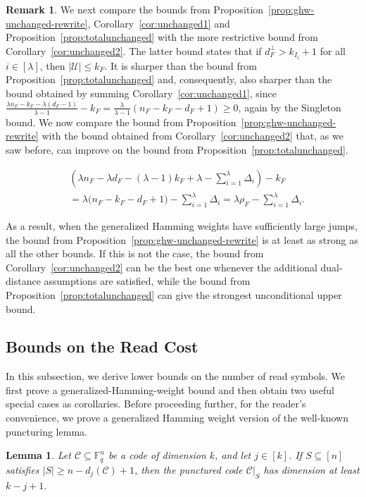 \documentclass[conference, 10pt]{IEEEtran}
\theoremstyle{plain}
\newtheorem{lemma}[theorem]{Lemma}
\theoremstyle{definition}
\newtheorem{remark}[definition]{Remark}
\newcommand{\numberset}{\mathbb}
\newcommand{\F}{\numberset{F}}
\newcommand{\mC}{\mathcal{C}}
\newcommand{\mU}{\mathcal{U}}
\begin{document}
\begin{remark}
We next compare the bounds from Proposition~\ref{prop:ghw-unchanged-rewrite}, Corollary~\ref{cor:unchanged1} and Proposition~\ref{prop:totalunchanged} with the more restrictive bound from Corollary~\ref{cor:unchanged2}. The latter bound states that if $d_F^\perp>k_{I_i}+1$ for all $i\in [\lambda]$, then $|\mU|\le k_F$. It is sharper than the bound from Proposition~\ref{prop:totalunchanged} and, consequently, also sharper than
the bound obtained by summing Corollary~\ref{cor:unchanged1}, since
$\frac{\lambda n_F-k_F-\lambda(d_F-1)}{\lambda-1}-k_F=\frac{\lambda}{\lambda-1}(n_F-k_F-d_F+1)\ge 0$, 
again by the Singleton bound. 
We now compare the bound from Proposition~\ref{prop:ghw-unchanged-rewrite} with the bound obtained from Corollary~\ref{cor:unchanged2} that, as we saw before, can improve on the bound from Proposition~\ref{prop:totalunchanged}.

\begin{align*} &\left( \lambda n_F-\lambda d_F-(\lambda-1)k_F+\lambda -\sum_{i=1}^{\lambda}\Delta_i \right)-k_F\\ &= \lambda\bigl(n_F-k_F-d_F+1\bigr) -\sum_{i=1}^{\lambda}\Delta_i= \lambda\rho_F-\sum_{i=1}^{\lambda}\Delta_i . \end{align*} 

As a result, when the generalized Hamming weights have sufficiently large jumps, the bound from Proposition~\ref{prop:ghw-unchanged-rewrite} is at least as strong as all the other bounds. If this is not the case, the bound from Corollary~\ref{cor:unchanged2} can be the best one whenever the additional dual-distance assumptions are satisfied, while the bound from Proposition~\ref{prop:totalunchanged} can give the strongest unconditional upper bound.
\end{remark}

\subsection{Bounds on the Read Cost}
\label{subsec:boundsread}

In this subsection, we derive lower bounds on the number of read symbols. We first prove a generalized-Hamming-weight bound and then obtain two useful special cases as corollaries. Before proceeding further, for the reader’s convenience, we prove a generalized Hamming weight version of the well-known puncturing lemma. 

\begin{lemma}\label{lem:puncturing-ghw-rewrite}
Let $\mC\subseteq \F_q^n$ be a code of dimension $k$, and let $j\in [k]$. If $S\subseteq [n]$ satisfies $|S|\ge n-d_j(\mC)+1$, then the punctured code $\mC|_S$ has dimension at least $k-j+1$.
\end{lemma}
\end{document}
